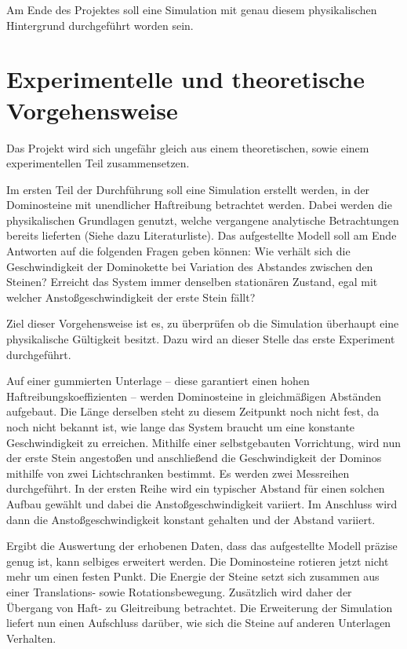 \documentclass[11pt,a4paper]{scrartcl}
\begin{document}
Am Ende des Projektes soll eine Simulation mit genau diesem physikalischen
Hintergrund durchgeführt worden sein.


\section{Experimentelle und theoretische Vorgehensweise}
Das Projekt wird sich ungefähr gleich aus einem theoretischen, sowie einem
experimentellen Teil zusammensetzen.

Im ersten Teil der Durchführung soll eine Simulation erstellt werden, in der
Dominosteine mit unendlicher Haftreibung betrachtet werden. Dabei werden die
physikalischen Grundlagen genutzt, welche vergangene analytische Betrachtungen
bereits lieferten (Siehe dazu Literaturliste).
Das aufgestellte Modell soll am Ende Antworten auf die folgenden Fragen geben
können:
Wie verhält sich die Geschwindigkeit der Dominokette bei Variation des
Abstandes zwischen den Steinen? Erreicht das System immer denselben stationären
Zustand, egal mit welcher Anstoßgeschwindigkeit der erste Stein fällt?

Ziel dieser Vorgehensweise ist es, zu überprüfen ob die Simulation überhaupt
eine physikalische Gültigkeit besitzt. Dazu wird an dieser Stelle das erste
Experiment durchgeführt.

Auf einer gummierten Unterlage – diese garantiert einen hohen
Haftreibungskoeffizienten – werden Dominosteine in gleichmäßigen Abständen
aufgebaut. Die Länge derselben steht zu diesem Zeitpunkt noch nicht fest, da
noch nicht bekannt ist, wie lange das System braucht um eine konstante
Geschwindigkeit zu erreichen.
Mithilfe einer selbstgebauten Vorrichtung, wird nun der erste Stein angestoßen
und anschließend die Geschwindigkeit der Dominos mithilfe von zwei
Lichtschranken bestimmt. Es werden zwei Messreihen durchgeführt.
In der ersten Reihe wird ein typischer Abstand für einen solchen Aufbau gewählt
und dabei die Anstoßgeschwindigkeit variiert. Im Anschluss wird dann die
Anstoßgeschwindigkeit konstant gehalten und der Abstand variiert.

Ergibt die Auswertung der erhobenen Daten, dass das aufgestellte Modell präzise
genug ist, kann selbiges erweitert werden. Die Dominosteine rotieren jetzt nicht
mehr um einen festen Punkt. Die Energie der Steine setzt sich zusammen aus einer
Translations- sowie Rotationsbewegung. Zusätzlich wird daher der Übergang von
Haft- zu Gleitreibung betrachtet.
Die Erweiterung der Simulation liefert nun einen Aufschluss darüber, wie sich
die Steine auf anderen Unterlagen Verhalten.
\end{document}
